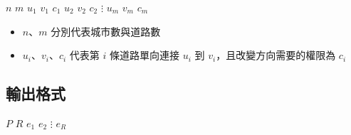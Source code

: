 \begin{format}
\f{
$n$ $m$
$u_1$ $v_1$ $c_1$
$u_2$ $v_2$ $c_2$
$\vdots$
$u_m$ $v_m$ $c_m$
}
\end{format}

\begin{itemize}
\tightlist
\item
  \begin{math}n\end{math}、\begin{math}m\end{math}
  分別代表城市數與道路數
\item
  \begin{math}u_i\end{math}、\begin{math}v_i\end{math}、\begin{math}c_i\end{math}
  代表第 \begin{math}i\end{math} 條道路單向連接
  \begin{math}u_i\end{math} 到
  \begin{math}v_i\end{math}，且改變方向需要的權限為
  \begin{math}c_i\end{math}
\end{itemize}

\subsection{輸出格式}

\begin{format}
\f{
$P$ $R$
$e_1$
$e_2$
$\vdots$
$e_R$
}
\end{format}

